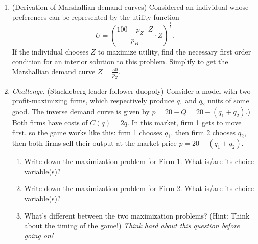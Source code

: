 \begin{CALCULUS}
\begin{enumerate}
\item (Derivation of Marshallian demand curves) Considered an individual whose preferences can be represented by the utility function
\[
U = \left( \frac{100-p_Z\cdot Z}{p_B} \cdot Z \right)^{\frac{1}{2}}.
\]
If the individual chooses $Z$ to maximize utility, find the necessary first order condition for an interior solution to this problem. Simplify to get the Marshallian demand curve $\displaystyle Z = \frac{50}{p_Z}.$




\item \emph{Challenge.} (Stackleberg leader-follower duopoly) Consider a model with two profit-maximizing firms, which respectively produce $q_1$ and $q_2$ units of some good. The inverse demand curve is given by $p = 20 - Q = 20 - (q_1 + q_2)$.) Both firms have costs of $C(q)=2q$. In this market, firm 1 gets to move first, so  the game works like this: firm 1 chooses $q_1$, then firm 2 chooses $q_2$, then both firms sell their output at the market price $p=20 - (q_1 + q_2)$.

    \begin{enumerate}

    \item Write down the maximization problem for Firm 1. What is/are its choice variable(s)?

    \item Write down the maximization problem for Firm 2. What is/are its choice variable(s)?

    \item What's different between the two maximization problems? (Hint: Think about the timing of the game!) \emph{Think hard about this question before going on!}


\end{enumerate}
\end{enumerate}
\end{CALCULUS}
